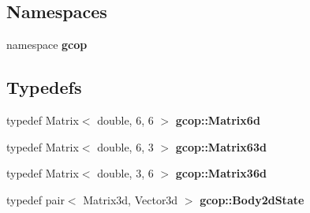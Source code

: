 \subsection*{\-Namespaces}
\begin{DoxyCompactItemize}
\item 
namespace {\bf gcop}
\end{DoxyCompactItemize}
\subsection*{\-Typedefs}
\begin{DoxyCompactItemize}
\item 
typedef \-Matrix$<$ double, 6, 6 $>$ {\bf gcop\-::\-Matrix6d}
\item 
typedef \-Matrix$<$ double, 6, 3 $>$ {\bf gcop\-::\-Matrix63d}
\item 
typedef \-Matrix$<$ double, 3, 6 $>$ {\bf gcop\-::\-Matrix36d}
\item 
typedef pair$<$ \-Matrix3d, \-Vector3d $>$ {\bf gcop\-::\-Body2d\-State}
\end{DoxyCompactItemize}
